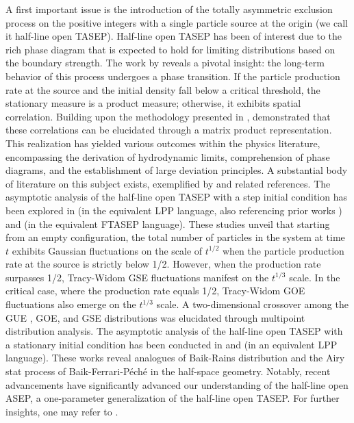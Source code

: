 \documentclass[12pt,a4paper]{amsart}
\theoremstyle{remark}
\numberwithin{equation}{section} \numberwithin{theorem}{section}
\begin{document}
A first important issue is the introduction of the totally asymmetric exclusion process on the positive integers with a single particle source at the origin (we call it half-line open TASEP). Half-line open TASEP has been of interest due to the rich phase diagram that is expected to hold for limiting distributions based on the boundary strength. The work by \cite{Ligg75} reveals a pivotal insight: the long-term behavior of this process undergoes a phase transition. If the particle production rate at the source and the initial density fall below a critical threshold, the stationary measure is a product measure; otherwise, it exhibits spatial correlation. Building upon the methodology presented in \cite{DEHP93}, \cite{Gro04} demonstrated that these correlations can be elucidated through a matrix product representation. This realization has yielded various outcomes within the physics literature, encompassing the derivation of hydrodynamic limits, comprehension of phase diagrams, and the establishment of large deviation principles. A substantial body of literature on this subject exists, exemplified by \cite{DMZ18} and related references. The asymptotic analysis of the half-line open TASEP with a step initial condition has been explored in \cite{BBCS18a} (in the equivalent LPP language, also referencing prior works \cite{BR01a, BR01b, SI04}) and \cite{BBCS18b} (in the equivalent FTASEP language). These studies unveil that starting from an empty configuration, the total number of particles in the system at time $t$ exhibits Gaussian fluctuations on the scale of $t^{1/2}$ when the particle production rate at the source is strictly below 1/2. However, when the production rate surpasses 1/2, Tracy-Widom GSE fluctuations \cite{TW96} manifest on the $t^{1/3}$ scale. In the critical case, where the production rate equals 1/2, Tracy-Widom GOE fluctuations \cite{TW96} also emerge on the $t^{1/3}$ scale. A two-dimensional crossover among the GUE \cite{TW94}, GOE, and GSE distributions was elucidated through multipoint distribution analysis. The asymptotic analysis of the half-line open TASEP with a stationary initial condition has been conducted in \cite{BFO20} and \cite{BFO22} (in an equivalent LPP language). These works reveal analogues of Baik-Rains distribution \cite{BR00} and the Airy stat process of Baik-Ferrari-Péché \cite{BFP10} in the half-space geometry. Notably, recent advancements have significantly advanced our understanding of the half-line open ASEP, a one-parameter generalization of the half-line open TASEP. For further insights, one may refer to \cite{BBCW18, BBC20, IMS22, He23}.
\end{document}
